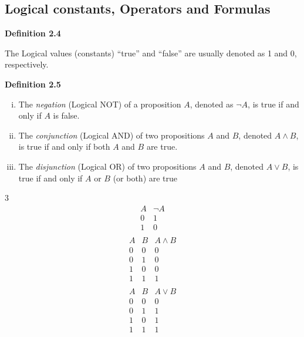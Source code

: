 \documentclass[a4paper]{report}
\newenvironment{definition}[1]{\begin{framed}\centerline{\textbf{Definition #1}}\noindent\hspace{-1.1mm}}{\end{framed}}
\begin{document}
\subsection{Logical constants, Operators and Formulas}
\begin{definition}{2.4}
The Logical values (constants) ``true'' and ``false'' are usually denoted as 1 and 0, respectively. 
\end{definition}
\begin{definition}{2.5}
\begin{enumerate}[i)]
\item The \emph{negation} (Logical NOT) of a proposition $A$, denoted as $\lnot A$, is true if and only if $A$ is false.
\item The \emph{conjunction} (Logical AND) of two propositions $A$ and $B$, denoted $A\land B$, is true if and only if both $A$ and $B$ are true.
\item The \emph{disjunction} (Logical OR) of two propositions $A$ and $B$, denoted $A\lor B$, is true if and only if $A$ or $B$ (or both) are true
\end{enumerate}
\end{definition}
\begin{multicols}{3}
\null \vfill
\begin{displaymath}
\begin{array}{c||c}
   A
 & \lnot{}A \\
\hline
0 & 1 \\
1 & 0 \\
\end{array}
\end{displaymath}
\null \vfill
\columnbreak
\null \vfill
\begin{displaymath}
\begin{array}{c|c||c}
   A
 & B
 & A\land{}B \\
\hline
0 & 0 & 0 \\
0 & 1 & 0 \\
1 & 0 & 0 \\
1 & 1 & 1 \\
\end{array}
\end{displaymath}
\null \vfill
\columnbreak
\null \vfill
\begin{displaymath}
\begin{array}{c|c||c}
   A
 & B
 & A\lor{}B \\
\hline
0 & 0 & 0 \\
0 & 1 & 1 \\
1 & 0 & 1 \\
1 & 1 & 1 \\
\end{array}
\end{displaymath}
\null \vfill
\end{multicols}
\end{document}
